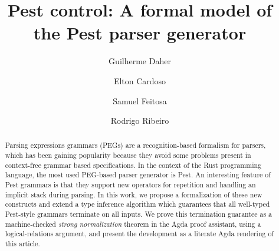\documentclass[preprint,12pt]{elsarticle}
\theoremstyle{definition}
\begin{document}
\begin{frontmatter}



\title{Pest control: A formal model of the Pest parser generator}

\author[ufop]{Guilherme Daher} %
\author[ufop]{Elton Cardoso}
\author[ufsc]{Samuel Feitosa}
\author[ufop]{Rodrigo Ribeiro} %


\begin{abstract}
Parsing expressions grammars (PEGs) are a recognition-based formalism for parsers,
which has been gaining popularity because they avoid some problems present in context-free grammar
based specifications. In the context of the Rust programming language, the most used
PEG-based parser generator is Pest. An interesting feature of Pest grammars is that they
support new operators for repetition and handling an implicit stack during parsing.
In this work, we propose a formalization of these new constructs and extend a
type inference algorithm which guarantees that all well-typed Pest-style grammars
terminate on all inputs. We prove this termination guarantee as a machine-checked
\emph{strong normalization} theorem in the Agda proof assistant, using a
logical-relations argument, and present the development as a literate Agda
rendering of this article.
\end{abstract}


\end{frontmatter}
\end{document}
